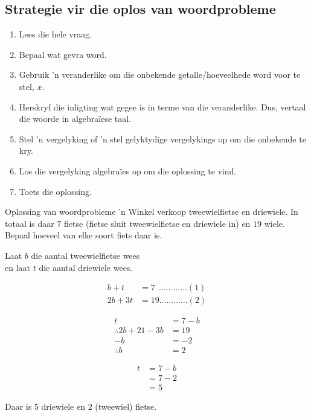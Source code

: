 \subsection*{Strategie vir die oplos van woordprobleme}

\begin{enumerate}[noitemsep, label=\textbf{\arabic*}. ] 
\item Lees die hele vraag.
\item Bepaal wat gevra word.
\item Gebruik ’n veranderlike om die onbekende getalle/hoeveelhede word voor te stel, $x$.
\item  Herskryf die inligting wat gegee is in terme van die veranderlike. Dus, vertaal die woorde in algebraïese
taal.
\item Stel ’n vergelyking of ’n stel gelyktydige vergelykings op om die onbekende te kry.
\item Los die vergelyking algebraïes op om die oplossing te vind.
\item Toets die oplossing.
\end{enumerate}


\begin{wex}
{Oplossing van woordprobleme}
{
 ’n Winkel verkoop tweewielfietse en driewiele. In totaal is daar $7$ fietse (fietse sluit tweewielfietse en driewiele in) en $19$ wiele. Bepaal hoeveel van elke soort fiets daar is.
}
{
Laat $b$ die aantal tweewielfietse wees  \\
en laat $t$  die aantal driewiele wees. 

\begin{align*}
  b + t &= 7 ~~\ldots \ldots \ldots \ldots (1)\\
  2b + 3t &= 19 \ldots \ldots \ldots \ldots (2)
\end{align*}

\begin{align*}
  t &= 7-b \\
  \therefore 2b + 21 - 3b &= 19 \\
  -b &= -2 \\
  \therefore b &= 2
\end{align*}

\begin{align*}
  t &= 7-b \\
    &= 7-2 \\
    &= 5
\end{align*}

Daar is $5$ driewiele en $2$ (tweewiel) fietse.
}       
\end{wex}

